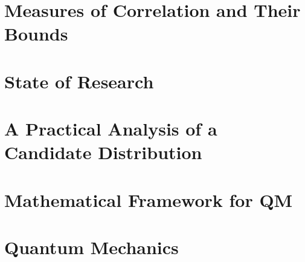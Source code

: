 \documentclass[titlepage]{report}
\theoremstyle{remark}
\begin{document}
\chapter{Measures of Correlation and Their Bounds}

 \chapter{State of Research}
 
 \chapter{A Practical Analysis of a Candidate Distribution}
 
% 

\begin{appendices}
	\chapter{Mathematical Framework for QM}
	
	\chapter{Quantum Mechanics}
	
%	
\end{appendices}

%
\printbibliography
\end{document}
